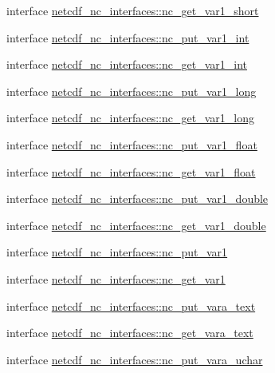\begin{DoxyCompactItemize}
\item 
interface \hyperlink{interfacenetcdf__nc__interfaces_1_1nc__get__var1__short}{netcdf\+\_\+nc\+\_\+interfaces\+::nc\+\_\+get\+\_\+var1\+\_\+short}
\item 
interface \hyperlink{interfacenetcdf__nc__interfaces_1_1nc__put__var1__int}{netcdf\+\_\+nc\+\_\+interfaces\+::nc\+\_\+put\+\_\+var1\+\_\+int}
\item 
interface \hyperlink{interfacenetcdf__nc__interfaces_1_1nc__get__var1__int}{netcdf\+\_\+nc\+\_\+interfaces\+::nc\+\_\+get\+\_\+var1\+\_\+int}
\item 
interface \hyperlink{interfacenetcdf__nc__interfaces_1_1nc__put__var1__long}{netcdf\+\_\+nc\+\_\+interfaces\+::nc\+\_\+put\+\_\+var1\+\_\+long}
\item 
interface \hyperlink{interfacenetcdf__nc__interfaces_1_1nc__get__var1__long}{netcdf\+\_\+nc\+\_\+interfaces\+::nc\+\_\+get\+\_\+var1\+\_\+long}
\item 
interface \hyperlink{interfacenetcdf__nc__interfaces_1_1nc__put__var1__float}{netcdf\+\_\+nc\+\_\+interfaces\+::nc\+\_\+put\+\_\+var1\+\_\+float}
\item 
interface \hyperlink{interfacenetcdf__nc__interfaces_1_1nc__get__var1__float}{netcdf\+\_\+nc\+\_\+interfaces\+::nc\+\_\+get\+\_\+var1\+\_\+float}
\item 
interface \hyperlink{interfacenetcdf__nc__interfaces_1_1nc__put__var1__double}{netcdf\+\_\+nc\+\_\+interfaces\+::nc\+\_\+put\+\_\+var1\+\_\+double}
\item 
interface \hyperlink{interfacenetcdf__nc__interfaces_1_1nc__get__var1__double}{netcdf\+\_\+nc\+\_\+interfaces\+::nc\+\_\+get\+\_\+var1\+\_\+double}
\item 
interface \hyperlink{interfacenetcdf__nc__interfaces_1_1nc__put__var1}{netcdf\+\_\+nc\+\_\+interfaces\+::nc\+\_\+put\+\_\+var1}
\item 
interface \hyperlink{interfacenetcdf__nc__interfaces_1_1nc__get__var1}{netcdf\+\_\+nc\+\_\+interfaces\+::nc\+\_\+get\+\_\+var1}
\item 
interface \hyperlink{interfacenetcdf__nc__interfaces_1_1nc__put__vara__text}{netcdf\+\_\+nc\+\_\+interfaces\+::nc\+\_\+put\+\_\+vara\+\_\+text}
\item 
interface \hyperlink{interfacenetcdf__nc__interfaces_1_1nc__get__vara__text}{netcdf\+\_\+nc\+\_\+interfaces\+::nc\+\_\+get\+\_\+vara\+\_\+text}
\item 
interface \hyperlink{interfacenetcdf__nc__interfaces_1_1nc__put__vara__uchar}{netcdf\+\_\+nc\+\_\+interfaces\+::nc\+\_\+put\+\_\+vara\+\_\+uchar}

\end{DoxyCompactItemize}

